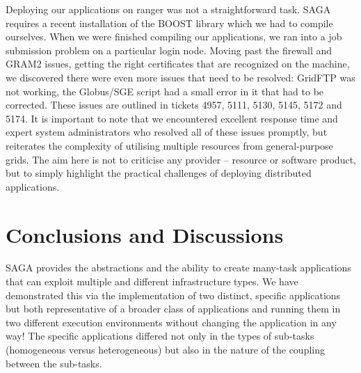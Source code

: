 \documentclass{llncs}
\begin{document}
Deploying our applications on ranger was not a straightforward task.
SAGA requires a recent installation of the BOOST library which we had
to compile ourselves. When we were finished compiling our
applications, we ran into a job submission problem on a particular
login node. %
Moving past the firewall and GRAM2 issues, getting the right
certificates that are recognized on the machine, we discovered there
were even more issues that need to be resolved: GridFTP was not
working, the Globus/SGE script had a small error in it that had to be
corrected.  These issues are outlined in tickets 4957, 5111, 5130,
5145, 5172 and 5174. It is important to note that we encountered
excellent response time and expert system administrators who resolved
all of these issues promptly, but reiterates the complexity of
utilising multiple resources from general-purpose grids.  The aim here
is not to criticise any provider -- resource or software product, but
to simply highlight the practical challenges of deploying distributed
applications.




\up\upp

\section{Conclusions and Discussions}

\up\upp

SAGA provides the abstractions and the ability to create many-task
applications that can exploit multiple and different infrastructure
types.  We have demonstrated this via the implementation of two
distinct, specific applications but both representative of a broader
class of applications and running them in two different execution
environments without changing the application in any way! The specific
applications differed not only in the types of sub-tasks (homogeneous
versus heterogeneous) but also in the nature of the coupling between
the sub-tasks.
  
\end{document}
